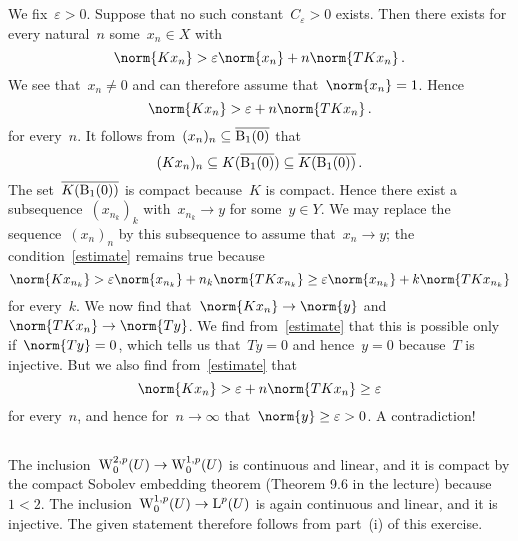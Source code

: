 \section{}





\subsection{}


We fix~$\varepsilon > 0$.
Suppose that no such constant~$C_\varepsilon > 0$ exists.
Then there exists for every natural~$n$ some~$x_n \in X$ with
\[
  \norm{ K x_n }
  >
  \varepsilon
  \norm{x_n}
  +
  n
  \norm{ T K x_n } \,.
\]
We see that~$x_n \neq 0$ and can therefore assume that~$\norm{x_n} = 1$.
Hence
\begin{equation}
  \label{estimate}
  \norm{ K x_n }
  >
  \varepsilon
  +
  n
  \norm{ T K x_n } \,.
\end{equation}
for every~$n$.
It follows from~$(x_n)_n \subseteq \overline{\operatorname{B}_{1}(0)}$ that
\[
  (K x_n)_n
  \subseteq
  K( \overline{\operatorname{B}_{1}(0)} )
  \subseteq
  \overline{ K(\operatorname{B}_{1}(0)) } \,.
\]
The set~$\overline{ K(\operatorname{B}_{1}(0)) }$ is compact because~$K$ is compact.
Hence there exist a subsequence~$(x_{n_k})_k$ with~$x_{n_k} \to y$ for some~$y \in Y$.
We may replace the sequence~$(x_n)_n$ by this subsequence to assume that~$x_n \to y$;
the condition~\eqref{estimate} remains true because
\[
  \norm{ K x_{n_k} }
  >
  \varepsilon
  \norm{x_{n_k}}
  +
  n_k
  \norm{ T K x_{n_k} }
  \geq
  \varepsilon
  \norm{x_{n_k}}
  +
  k
  \norm{ T K x_{n_k} }
\]
for every~$k$.
We now find that~$\norm{K x_n} \to \norm{y}$ and~$\norm{T K x_n} \to \norm{T y}$.
We find from~\eqref{estimate} that this is possible only if~$\norm{T y} = 0$, which tells us that~$Ty = 0$ and hence~$y = 0$ because~$T$ is injective.
But we also find from~\eqref{estimate} that
\[
  \norm{ K x_n }
  >
  \varepsilon
  +
  n
  \norm{ T K x_n }
  \geq
  \varepsilon
\]
for every~$n$, and hence for~$n \to \infty$ that~$\norm{y} \geq \varepsilon > 0$.
A contradiction!





\subsection{}

The inclusion~$\operatorname{W}^{2,p}_0(U) \to \operatorname{W}^{1,p}_0(U)$ is continuous and linear, and it is compact by the compact Sobolev embedding theorem (Theorem 9.6 in the lecture) because~$1 < 2$.
The inclusion~$\operatorname{W}^{1,p}_0(U) \to \operatorname{L}^p(U)$ is again continuous and linear, and it is injective.
The given statement therefore follows from part~(i) of this exercise.





